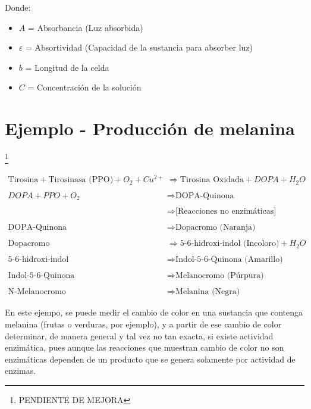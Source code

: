 Donde:

\begin{itemize}
    \item $A$ = Absorbancia (Luz absorbida)
    \item $\varepsilon$ = Absortividad (Capacidad de la sustancia para absorber luz) 
    \item $b$ = Longitud de la celda
    \item $C$ = Concentración de la solución
\end{itemize}

\section{Ejemplo - Producción de melanina}\footnote{PENDIENTE DE MEJORA}

\begin{align*}
    \text{Tirosina} + \text{Tirosinasa (PPO)} + O_2 + Cu^{2+} &\Longrightarrow \text{Tirosina Oxidada} + DOPA + H_2O
    \\
    \\
    DOPA + PPO + O_2 &\Longrightarrow \text{DOPA-Quinona}
    \\
    \\
    &\Longrightarrow \text{[Reacciones no enzimáticas]}
    \\
    \\
    \text{DOPA-Quinona} &\Longrightarrow \text{Dopacromo (Naranja)}
    \\
    \\
    \text{Dopacromo} &\Longrightarrow \text{5-6-hidroxi-indol (Incoloro)} + H_2O
    \\
    \\
    \text{5-6-hidroxi-indol} &\Longrightarrow \text{Indol-5-6-Quinona (Amarillo)}
    \\
    \\
    \text{Indol-5-6-Quinona} &\Longrightarrow \text{Melanocromo (Púrpura)}
    \\
    \\
    \text{N-Melanocromo} &\Longrightarrow \text{Melanina (Negra)}
\end{align*}

En este ejempo, se puede medir el cambio de color en una sustancia que contenga melanina (frutas o verduras, por ejemplo), y a partir de ese cambio de color determinar, de manera general y tal vez no tan exacta, si existe actividad enzimática, pues aunque las reacciones que muestran cambio de color no son enzimáticas dependen de un producto que se genera solamente por actividad de enzimas.

